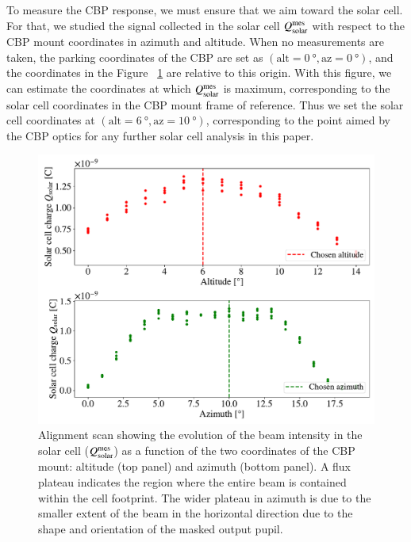 To measure the CBP response, we must ensure that we aim toward the solar cell. For that, we studied the signal collected in the solar cell $Q_{\mathrm{solar}}^{\mathrm{mes}}$ with respect to the CBP mount coordinates in azimuth and altitude. When no measurements are taken, the parking coordinates of the CBP are set as $(\mathrm{alt} = \SI{0}{\degree}, \mathrm{az} = \SI{0}{\degree})$, and the coordinates in the Figure~ \ref{fig:cross_sc} are relative to this origin. With this figure, we can estimate the coordinates at which $Q_{\mathrm{solar}}^{\mathrm{mes}}$ is maximum, corresponding to the solar cell coordinates in the CBP mount frame of reference. Thus we set the solar cell coordinates at $(\mathrm{alt} = \SI{6}{\degree}, \mathrm{az} = \SI{10}{\degree})$, corresponding to the point aimed by the CBP optics for any further solar cell analysis in this paper.

\begin{figure}[h]
    \centering
    \includegraphics[width=\columnwidth]{fig/cross_solarcell.pdf}
    \caption{Alignment scan showing the evolution of the beam
      intensity in the solar cell ($Q_{\mathrm{solar}}^{\mathrm{mes}}$) as a function of the
      two coordinates of the CBP mount: altitude (top panel) and
      azimuth (bottom panel). A flux plateau indicates the region
      where the entire beam is contained within the cell
      footprint. The wider plateau in azimuth is due to the smaller
      extent of the beam in the horizontal direction due to the shape
      and orientation of the masked output pupil.  }
    \label{fig:cross_sc}
\end{figure}


